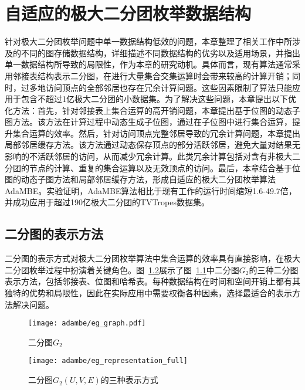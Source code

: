 \chapter{自适应的极大二分团枚举数据结构}
\label{ch:adapt_mbe}

针对极大二分团枚举问题中单一数据结构低效的问题，本章整理了相关工作中所涉及的不同的图存储数据结构，详细描述不同数据结构的优劣以及适用场景，并指出单一数据结构所导致的局限性，作为本章的研究动机。具体而言，现有算法通常采用邻接表结构表示二分图，在进行大量集合交集运算时会带来较高的计算开销；同时，过多地访问顶点的全部邻居也存在冗余计算问题。这些因素限制了算法只能应用于包含不超过1亿极大二分团的小数据集。为了解决这些问题，本章提出以下优化方法：首先，针对邻接表上集合运算的高开销问题，本章提出基于位图的动态子图方法。该方法在计算过程中动态生成子位图，通过在子位图中进行集合运算，提升集合运算的效率。然后，针对访问顶点完整邻居导致的冗余计算问题，本章提出局部邻居缓存方法。该方法通过动态保存顶点的部分活跃邻居，避免大量对结果无影响的不活跃邻居的访问，从而减少冗余计算。此类冗余计算包括对含有非极大二分团的节点的计算、重复的集合运算以及无效顶点的访问。最后，本章结合基于位图的动态子图方法和局部邻居缓存方法，形成自适应的极大二分团枚举算法AdaMBE。实验证明，AdaMBE算法相比于现有工作的运行时间缩短1.6-49.7倍，并成功应用于超过190亿极大二分团的TVTropes数据集。

\section{二分图的表示方法}

二分图的表示方式对极大二分团枚举算法中集合运算的效率具有直接影响，在极大二分团枚举过程中扮演着关键角色。图~\ref{fig:ada_graph_format}展示了图~\ref{fig:ada_eg_tree}中二分图$G_2$的三种二分图表示方法，包括邻接表、位图和哈希表。每种数据结构在时间和空间开销上都有其独特的优势和局限性，因此在实际应用中需要权衡各种因素，选择最适合的表示方法解决问题。

\begin{figure} [H]
  \centering
  \texttt{[image: adambe/eg\_graph.pdf]}
  \caption{二分图$G_2$}
  \label{fig:ada_eg_tree}
\end{figure}


\begin{figure} [H]
	\centering
  \vspace{0.1in}
	\texttt{[image: adambe/eg\_representation\_full]}
  \vspace{0.2in}
	\caption{二分图$G_2(U,V,E)$的三种表示方式}

	\label{fig:ada_graph_format}
\end{figure}

